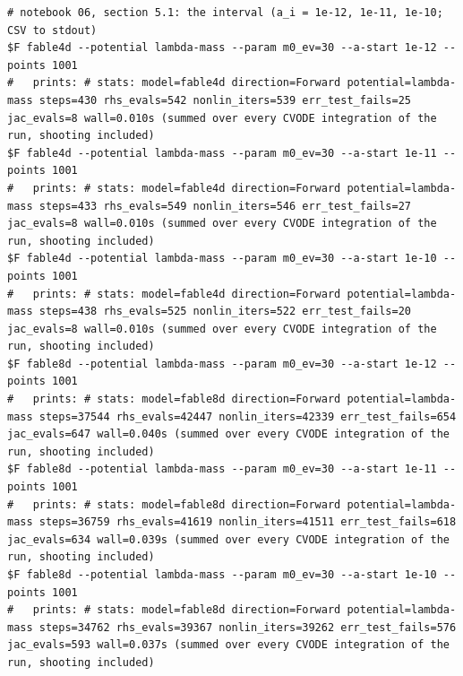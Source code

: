 \begin{Verbatim}[fontsize=\scriptsize]
# notebook 06, section 5.1: the interval (a_i = 1e-12, 1e-11, 1e-10; CSV to stdout)
$F fable4d --potential lambda-mass --param m0_ev=30 --a-start 1e-12 --points 1001
#   prints: # stats: model=fable4d direction=Forward potential=lambda-mass steps=430 rhs_evals=542 nonlin_iters=539 err_test_fails=25 jac_evals=8 wall=0.010s (summed over every CVODE integration of the run, shooting included)
$F fable4d --potential lambda-mass --param m0_ev=30 --a-start 1e-11 --points 1001
#   prints: # stats: model=fable4d direction=Forward potential=lambda-mass steps=433 rhs_evals=549 nonlin_iters=546 err_test_fails=27 jac_evals=8 wall=0.010s (summed over every CVODE integration of the run, shooting included)
$F fable4d --potential lambda-mass --param m0_ev=30 --a-start 1e-10 --points 1001
#   prints: # stats: model=fable4d direction=Forward potential=lambda-mass steps=438 rhs_evals=525 nonlin_iters=522 err_test_fails=20 jac_evals=8 wall=0.010s (summed over every CVODE integration of the run, shooting included)
$F fable8d --potential lambda-mass --param m0_ev=30 --a-start 1e-12 --points 1001
#   prints: # stats: model=fable8d direction=Forward potential=lambda-mass steps=37544 rhs_evals=42447 nonlin_iters=42339 err_test_fails=654 jac_evals=647 wall=0.040s (summed over every CVODE integration of the run, shooting included)
$F fable8d --potential lambda-mass --param m0_ev=30 --a-start 1e-11 --points 1001
#   prints: # stats: model=fable8d direction=Forward potential=lambda-mass steps=36759 rhs_evals=41619 nonlin_iters=41511 err_test_fails=618 jac_evals=634 wall=0.039s (summed over every CVODE integration of the run, shooting included)
$F fable8d --potential lambda-mass --param m0_ev=30 --a-start 1e-10 --points 1001
#   prints: # stats: model=fable8d direction=Forward potential=lambda-mass steps=34762 rhs_evals=39367 nonlin_iters=39262 err_test_fails=576 jac_evals=593 wall=0.037s (summed over every CVODE integration of the run, shooting included)
\end{Verbatim}
